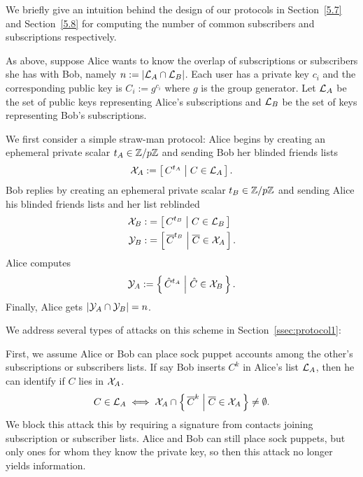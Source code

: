 \documentclass{article}
\begin{document}
We briefly give an intuition behind the design of our protocols
in Section~\ref{5.7} and Section~\ref{5.8} for computing
the number of common subscribers and subscriptions respectively.

As above, suppose Alice wants to know the overlap of subscriptions or
subscribers she has with Bob, namely $n := |{\cal L}_A \cap {\cal L}_B|$.
Each user has a private key $c_i$ and
the corresponding public key is $C_i := g^{c_i}$ where
 $g$ is the group generator.
Let ${\cal L}_A$ be the set of public keys representing
Alice's subscriptions and ${\cal L}_B$ be the set of keys representing
Bob's subscriptions.

We first consider a simple straw-man protocol:
Alice begins by creating an ephemeral private scalar $t_A \in \mathbb{Z}/p\mathbb{Z}$
and sending Bob her blinded friends lists
\begin{equation}
  {\cal X}_A := %
  \Listst{ C^{t_A} }{ C \in {\cal L}_A }
  \mathperiod
\end{equation}
Bob replies by creating an ephemeral private scalar $t_B \in \mathbb{Z}/p\mathbb{Z}$
and sending Alice his blinded friends lists and her list reblinded
\begin{align}
  {\cal X}_B :&= %
  \Listst{ C^{t_B} }{ C \in {\cal L}_B }  \\
  {\cal Y}_B :&= %
  \Listst{ \overline{C}^{t_B} }{ \overline{C} \in {\cal X}_A }
  \mathperiod
\end{align}
Alice computes
\begin{equation}
  {\cal Y}_A :=
  \Setst{ \hat{C}^{t_A}}{ \hat{C} \in {\cal X}_B }
  \mathperiod
\end{equation}
Finally, Alice gets $|{\cal Y}_A \cap {\cal Y}_B| = n$.

We address several types of attacks on this scheme
 in Section~\ref{ssec:protocol1}:

First, we assume Alice or Bob can place sock puppet accounts among
the other's subscriptions or subscribers lists.
If say Bob inserts $C^k$ in Alice's list ${\cal L}_A$, then
he can identify if $C$ lies in ${\cal X}_A$. %
\begin{equation}
   C \in {\cal L}_A \iff
   {\cal X}_A \cap
   \Setst{ \overline{C}^k }{ \overline{C} \in {\cal X}_A}
   \neq \emptyset
  \mathperiod
\end{equation}
We block this attack this by requiring a signature from contacts
joining subscription or subscriber lists.  Alice and Bob can still
place sock puppets, but only ones for whom they know the private
key, so then this attack no longer yields information.
\end{document}
